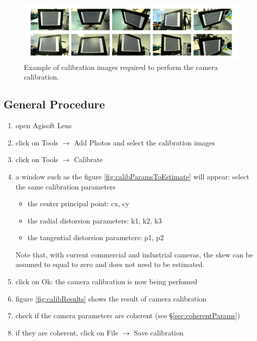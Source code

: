 \documentclass[11pt]{article}
\begin{document}
 \begin{figure}[h]
 	\begin{center}
 		\includegraphics[width=17 cm]{images/calibImages.pdf}
 	\end{center}
 	\caption{Example of calibration images required to perform the camera calibration.}
 	\label{fig:exampleViewpoints}
 \end{figure}

\subsection{General Procedure}
\begin{enumerate}
\item open Agisoft Lens
\item click on Tools $\rightarrow$ Add Photos and select the calibration images
\item click on Tools $\rightarrow$ Calibrate
\item a window such as the figure \ref{fig:calibParamsToEstimate} will appear: select the same calibration parameters
\begin{itemize}
\item the center principal point: cx, cy
\item the radial distorsion parameters: k1, k2, k3
\item the tangential distorsion parameters: p1, p2
\end{itemize}
Note that, with current commercial and industrial cameras, the skew can be assumed to equal to zero and does not need to be estimated.
\item click on Ok: the camera calibration is now being perfomed
\item figure \ref{fig:calibResults} shows the result of camera calibration
\item check if the camera parameters are coherent (see \S\ref{sec:coherentParams})
\item if they are coherent, click on File $\rightarrow$ Save calibration
\end{enumerate}
\end{document}
